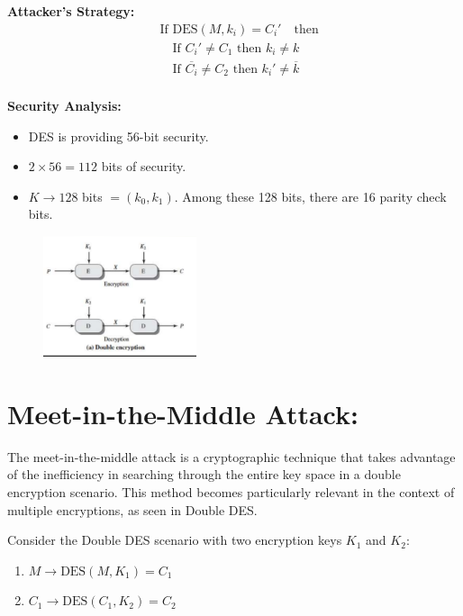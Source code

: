 \documentclass[11pt]{article}
\begin{document}
\textbf{Attacker's Strategy:}
\begin{align*}
    &\text{If } \text{DES}(M, k_i) = C_i'  \quad \text{then} \\
    &\quad \text{If } C_i' \neq C_1 \text{ then } k_i \neq k  \\
    &\quad \text{If } \overline{C_i} \neq C_2 \text{ then } k_i' \neq \overline{k} \\
\end{align*}

\textbf{Security Analysis:}
\begin{itemize}
    \item DES is providing 56-bit security.
    \item $2 \times 56 = 112$ bits of security.
    \item $K \rightarrow 128$ bits $= (k_0, k_1)$. Among these 128 bits, there are 16 parity check bits.
\end{itemize}

\begin{figure}
    \centering
    \includegraphics[width=0.4\textwidth]{img3.1.PNG} %
    \caption{} %
\end{figure}

\section*{Meet-in-the-Middle Attack:}

The meet-in-the-middle attack is a cryptographic technique that takes advantage of the inefficiency in searching through the entire key space in a double encryption scenario. This method becomes particularly relevant in the context of multiple encryptions, as seen in Double DES.

Consider the Double DES scenario with two encryption keys \(K_1\) and \(K_2\):
\begin{enumerate}
    \item \(M \rightarrow \text{DES}(M, K_1) = C_1\)
    \item \(C_1 \rightarrow \text{DES}(C_1, K_2) = C_2\)
\end{enumerate}
\end{document}
